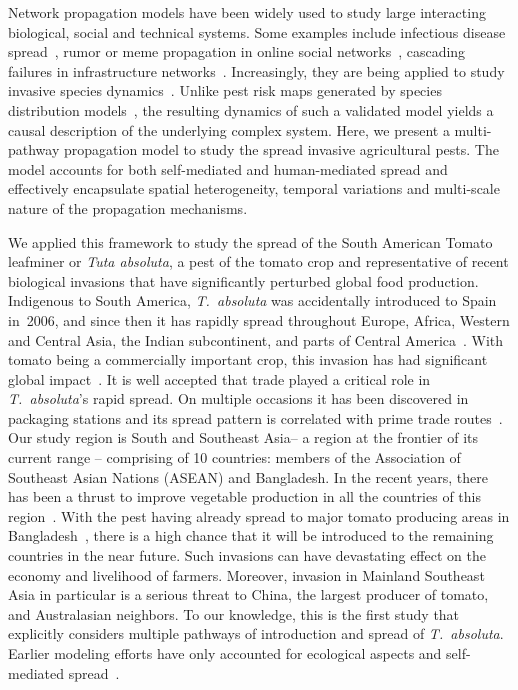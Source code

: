 \documentclass[11pt]{article}
\newcommand{\tuta}{\emph{T.~absoluta}}
\theoremstyle{definition}
\begin{document}
Network propagation models have been widely used to study large interacting
biological, social and technical systems. Some examples include infectious
disease spread~\cite{eubank2004modelling}, rumor or meme propagation in
online social networks~\cite{guille2013information}, cascading failures in
infrastructure networks~\cite{buldyrev2010catastrophic}.  Increasingly,
they are being applied to study invasive species
dynamics~\cite{douma2016pathway,carrasco2010unveiling,sutrave2012identifying,nopsa2015ecological,jordan2019modeling}.
Unlike pest risk maps generated by species distribution
models~\cite{pearson2007species}, the resulting dynamics of such a
validated model yields a causal description of the underlying complex
system. Here, we present a multi-pathway propagation model to study the
spread invasive agricultural pests. The model accounts for both
self-mediated and human-mediated spread and effectively encapsulate spatial
heterogeneity, temporal variations and multi-scale nature of the
propagation mechanisms.

We applied this framework to study the spread of the South American Tomato
leafminer or \emph{Tuta absoluta}, a pest of the tomato crop and
representative of recent biological invasions that have significantly
perturbed global food production.  Indigenous to South America, \tuta{} was
accidentally introduced to Spain in~2006, and since then it has rapidly
spread throughout Europe, Africa, Western and Central Asia, the Indian
subcontinent, and parts of Central
America~\cite{desneux2010biological,biondi2017}. With tomato being a
commercially important crop, this invasion has had significant global
impact~\cite{campos2017western}. It is well accepted that trade
played a critical role in \tuta{}'s rapid spread. On multiple occasions it
has been discovered in packaging stations and its spread pattern is
correlated with prime trade routes~\cite{karadjova2013tuta}. Our study
region is South and Southeast Asia-- a region at the frontier of its
current range -- comprising of 10 countries: members of the Association of
Southeast Asian Nations (ASEAN) and Bangladesh.  In the recent years, there
has been a thrust to improve vegetable production in all the countries of
this region~\cite{ali2001}. With the pest having already spread to major
tomato producing areas in Bangladesh~\cite{hossain2016first}, there is a
high chance that it will be introduced to the remaining countries in the
near future. Such invasions can have devastating effect on the economy and
livelihood of farmers.  Moreover, invasion in Mainland Southeast Asia in
particular is a serious threat to China, the largest producer of tomato,
and Australasian neighbors. To our knowledge, this is the first study that
explicitly considers multiple pathways of introduction and spread of
\tuta{}.  Earlier modeling efforts have only accounted for ecological
aspects and self-mediated
spread~\cite{desneux2010biological,tonnang2015identification,guimapi2016modeling}.
\end{document}
